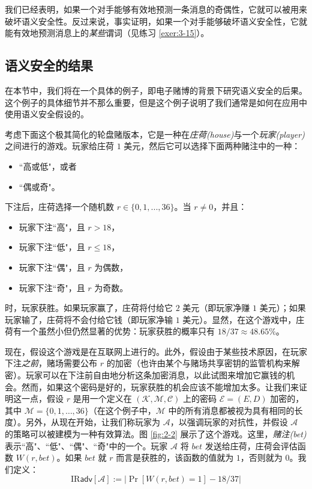 我们已经表明，如果一个对手能够有效地预测一条消息的奇偶性，它就可以被用来破坏语义安全性。反过来说，事实证明，如果一个对手能够破坏语义安全性，它就能有效地预测消息上的\emph{某些}谓词（见练习 \ref{exer:3-15}）。

\subsection{语义安全的结果}\label{subsec:2-2-4}

在本节中，我们将在一个具体的例子，即电子赌博的背景下研究语义安全的后果。这个例子的具体细节并不那么重要，但是这个例子说明了我们通常是如何在应用中使用语义安全假设的。


考虑下面这个极其简化的轮盘赌版本，它是一种在\emph{庄荷(house)}与一个\emph{玩家(player)}之间进行的游戏。玩家给庄荷 $1$ 美元，然后它可以选择下面两种赌注中的一种：
\begin{itemize}
	\item ``高或低"，或者
	\item ``偶或奇"。
\end{itemize}
下注后，庄荷选择一个随机数 $r\in\{0,1,...,36\}$。当 $r\neq 0$，并且：
\begin{itemize}
	\item 玩家下注``高"，且 $r>18$，
	\item 玩家下注``低"，且 $r\leq18$，
	\item 玩家下注``偶"，且 $r$ 为偶数，
	\item 玩家下注``奇"，且 $r$ 为奇数。
\end{itemize}
时，玩家获胜。如果玩家赢了，庄荷将付给它 $2$ 美元（即玩家净赚 $1$ 美元）；如果玩家输了，庄荷将不会付给它钱（即玩家净输 $1$ 美元）。显然，在这个游戏中，庄荷有一个虽然小但仍然显著的优势：玩家获胜的概率只有 $18/37\approx48.65\%$。

现在，假设这个游戏是在互联网上进行的。此外，假设由于某些技术原因，在玩家下注\emph{之前}，赌场需要公布 $r$ 的加密（也许由某个与赌场共享密钥的监管机构来解密）。玩家可以在下注前自由地分析这条加密消息，以此试图来增加它赢钱的机会。然而，如果这个密码是好的，玩家获胜的机会应该不能增加太多。让我们来证明这一点，假设 $r$ 是用一个定义在 $(\mathcal{K},\mathcal{M},\mathcal{C})$ 上的密码 $\mathcal{E}=(E,D)$ 加密的，其中 $\mathcal{M}=\{0,1,\dots,36\}$（在这个例子中，$\mathcal{M}$ 中的所有消息都被视为具有相同的长度）。另外，从现在开始，让我们称玩家为 $\mathcal{A}$，以强调玩家的对抗性，并假设 $\mathcal{A}$ 的策略可以被建模为一种有效算法。图 \ref{fig:2-2} 展示了这个游戏。这里，\emph{赌注(bet)}表示``高"、``低"、``偶"、``奇"中的一个。玩家 $\mathcal{A}$ 将 $\mathit{bet}$ 发送给庄荷，庄荷会评估函数 $W(r,\mathit{bet})$。如果 $\mathit{bet}$ 就 $r$ 而言是获胜的，该函数的值就为 $1$，否则就为 $0$。我们定义：
\[
\mathrm{IR}\mathsf{adv}[\mathcal{A}]
:=
\big\lvert
\Pr[W(r,bet)=1]-18/37
\big\rvert
\]

